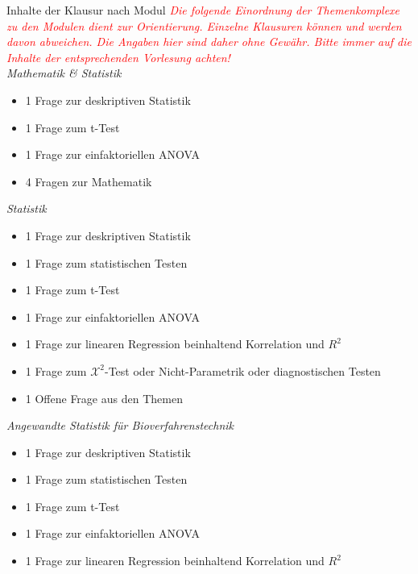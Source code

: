\documentclass[a4paper, 9pt]{scrartcl}\usepackage[]{graphicx}\usepackage[]{xcolor}
\begin{document}
\maketitle
\thispagestyle{empty}
\clearpage

\begin{graybox}{Inhalte der Klausur nach Modul}  
  \small
  \textcolor{red}{\textit{Die folgende Einordnung der Themenkomplexe zu den
      Modulen dient zur Orientierung. Einzelne Klausuren k{\"o}nnen und werden
      davon abweichen. Die Angaben hier sind daher ohne Gew{\"a}hr. Bitte immer
    auf die Inhalte der entsprechenden Vorlesung achten!}}\\[1Ex]
  \textit{Mathematik \& Statistik} 
  \begin{itemize}
  \item 1 Frage zur deskriptiven Statistik
  \item 1 Frage zum t-Test
  \item 1 Frage zur einfaktoriellen ANOVA
  \item 4 Fragen zur Mathematik
  \end{itemize} 
  \textit{Statistik} 
  \begin{itemize}
  \item 1 Frage zur deskriptiven Statistik
  \item 1 Frage zum statistischen Testen
  \item 1 Frage zum t-Test
  \item 1 Frage zur einfaktoriellen ANOVA
  \item 1 Frage zur linearen Regression beinhaltend Korrelation und $R^2$
  \item 1 Frage zum $\mathcal{X}^2$-Test oder Nicht-Parametrik oder
    diagnostischen Testen
  \item 1 Offene Frage aus den Themen
  \end{itemize} 
  \textit{Angewandte Statistik f{\"u}r Bioverfahrenstechnik } 
  \begin{itemize}
  \item 1 Frage zur deskriptiven Statistik
  \item 1 Frage zum statistischen Testen
  \item 1 Frage zum t-Test
  \item 1 Frage zur einfaktoriellen ANOVA
  \item 1 Frage zur linearen Regression beinhaltend Korrelation und $R^2$

\end{itemize}
\end{graybox}
\end{document}
